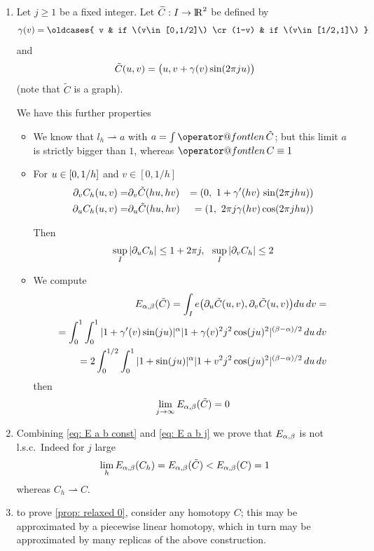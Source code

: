 \documentclass[twoside,a4paper,english]{article}
\makeatletter
\def\derpar#1{\partial_{#1}}
\def\wto{\rightharpoonup}
\def\len{\mathop{\operator@font len}\nolimits}
\makeatother
\begin{document}
\begin{enumerate}
\item
  Let $j\ge 1$ be a fixed integer.
  Let  $\widetilde C:I\to{\protect\mathrm{l\hskip-0.15em R}}^2$ be defined by
  \begin{equation}
    \gamma(v)=\oldcases{
      v  & if  \(v\in[0,1/2]\) \cr
      (1-v) & if  \(v\in[1/2,1]\)
    }
  \end{equation}
  and
  \begin{equation}
    \tilde C(u,v) =\big( u,  v+\gamma(v)\sin(2\pi ju) \big)
  \end{equation}
  (note that $\tilde C$ is a graph).
  

  We have this further properties
 \begin{itemize}
 \item 
   We know that  $l_h\wto a$ with $a=\int \len \tilde C$;
   but this limit $a$ is strictly bigger than $1$, whereas 
   $\len   C\equiv 1$
 \item
   For $u\in[0,1/h]$ and $v\in[0,1/h]$
   \begin{eqnarray*}
     \derpar  v C_h(\t,v) =&  \derpar  v \tilde C(h\t,hv)
     &=(0,~ 1+\gamma'(hv)\,\sin(2\pi jh\t))\\
     \derpar \t C_h(\t,v) =&  \derpar \t \tilde C(h\t,hv)
     &=(1,~ 2\pi j  \gamma(hv)   \cos(2\pi jh \t) )
   \end{eqnarray*} 
   
   Then
   \[ \sup_I |\derpar \t C_h| \le 1+2\pi j ,~~
   \sup_I |\derpar v C_h|\le 2   \] 
   
 \item 
   We compute
   \begin{eqnarray*}
     E_{\a,\b}(\tilde C) =
     \int_I e\big(\derpar\t \tilde C(\t,v),\derpar v \tilde
     C(\t,v)\big)   d\t\,dv = 
     \\ =
     \int_0^{1} \int_0^1 |1+\gamma'(v)\sin(j\t)|^{\a}
     |1+\gamma(v)^2 j^2\cos(j\t)^2   |^{(\b-\a)/2} \,d\t\,dv
     \\ =
     2\int_0^{1/2} \int_0^1 |1+\sin(j\t)|^{\a}
     |1+v^2 j^2\cos(j\t)^2   |^{(\b-\a)/2} \,d\t\,dv
   \end{eqnarray*}
   then
   \begin{equation}     \label{eq: E a b j}
     \lim_{j\to\infty} E_{\alpha,\beta}(\tilde C) = 0
   \end{equation}
 \end{itemize}
\item 
  Combining \eqref{eq: E a b const} and \eqref{eq: E a b j}  
  we prove that  $E_{\alpha,\beta}$ is not  l.s.c.\ Indeed for
  $j$ large
  \[ \lim_h E_{\alpha,\beta}(C_h)=  E_{\alpha,\beta}(\tilde C)
  <    E_{\alpha,\beta} (C)=1 \]
  whereas $C_h\wto C$. 
\item to prove \ref{prop: relaxed 0}, consider any homotopy $C$;
  this may be approximated by a piecewise linear  homotopy,
  which in turn may be approximated by many replicas of the above construction.
\end{enumerate}
\end{document}
